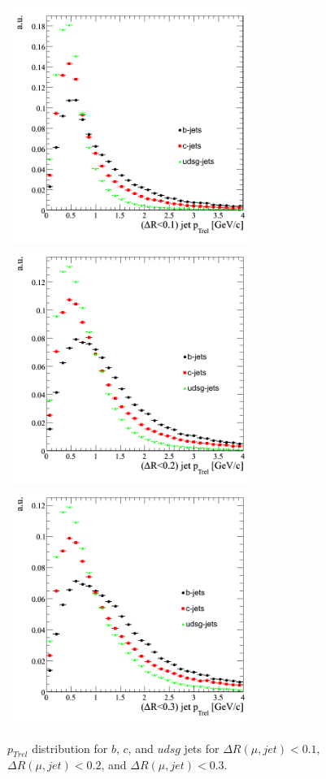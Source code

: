 \begin{figure}[htbp]
  \begin{center}
    \includegraphics[width=80mm]{Figures/jet_ptrel_deltaR1.png}
    \includegraphics[width=80mm]{Figures/jet_ptrel_deltaR2.png}
    \includegraphics[width=80mm]{Figures/jet_ptrel_deltaR3.png}
  \end{center}
  \caption{$p_{Trel}$ distribution for $b$, $c$, and $udsg$ jets for $\Delta R(\mu,jet)<0.1$, $\Delta R(\mu,jet)<0.2$, and $\Delta R(\mu,jet)<0.3$.}
  \label{fig:jet_ptrel}
\end{figure}

\clearpage
